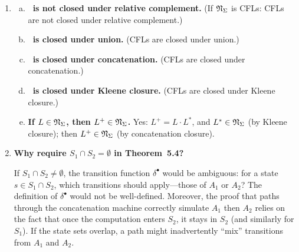 \begin{enumerate}[{5.}1. ]
\begin{enumerate}[(a)]
  \begin{proof}
  By induction on $|x|$.

  \emph{Base ($|x|=0$):}  $\overline{\delta^\cup}(s,\lambda)=\{s\}=\DBAR_i(s,\lambda)$ (by definition of extended transition functions for single start-states, noting NDFAs).

  \emph{Step:}  Assume $\overline{\delta^\cup}(s,x)=\DBAR_i(s,x)$ for $s\in S_i$.  For $x\pmb{a}$:
  \[
    \overline{\delta^\cup}(s,x\pmb{a})
    =\bigcup_{t\in\overline{\delta^\cup}(s,x)}\delta^\cup(t,\pmb{a})
    =\bigcup_{t\in\DBAR_i(s,x)}\delta_i(t,\pmb{a})
    =\DBAR_i(s,x\pmb{a}),
  \]
  where we used the fact that $\DBAR_i(s,x)\subseteq S_i$ (paths from $s\in S_i$ stay in $S_i$, since $\delta_i:S_i\to\wp(S_i)$) and $\delta^\cup(t,\pmb{a})=\delta_i(t,\pmb{a})$ for $t\in S_i$. \qed
  \end{proof}

  \item \textbf{Was this used in Theorem~5.2?}  Yes, implicitly: the proof that $L(A^\cup)=L_1\cup L_2$ relies on the fact that paths starting in $S_1$ stay in $S_1$ and paths starting in $S_2$ stay in $S_2$, which is exactly this lemma.
\end{enumerate}

\item \begin{enumerate}[(a)]
  \item \textbf{\NSIG\ is not closed under relative complement.}  (If $\mathfrak{N}_\Sigma$ is CFLs: CFLs are not closed under relative complement.)
  \item \textbf{\NSIG\ is closed under union.}  (CFLs are closed under union.)
  \item \textbf{\NSIG\ is closed under concatenation.}  (CFLs are closed under concatenation.)
  \item \textbf{\NSIG\ is closed under Kleene closure.}  (CFLs are closed under Kleene closure.)
  \item \textbf{If $L\in\mathfrak{N}_\Sigma$, then $L^+\in\mathfrak{N}_\Sigma$.}  Yes: $L^+=L\cdot L^*$, and $L^*\in\mathfrak{N}_\Sigma$ (by Kleene closure); then $L^+\in\mathfrak{N}_\Sigma$ (by concatenation closure).
\end{enumerate}

\item \textbf{Why require $S_1\cap S_2=\emptyset$ in Theorem~5.4?}

If $S_1\cap S_2\neq\emptyset$, the transition function $\delta^\bullet$ would be ambiguous: for a state $s\in S_1\cap S_2$, which transitions should apply---those of $A_1$ or $A_2$?  The definition of $\delta^\bullet$ would not be well-defined.  Moreover, the proof that paths through the concatenation machine correctly simulate $A_1$ then $A_2$ relies on the fact that once the computation enters $S_2$, it stays in $S_2$ (and similarly for $S_1$).  If the state sets overlap, a path might inadvertently ``mix'' transitions from $A_1$ and $A_2$.


\end{enumerate}
